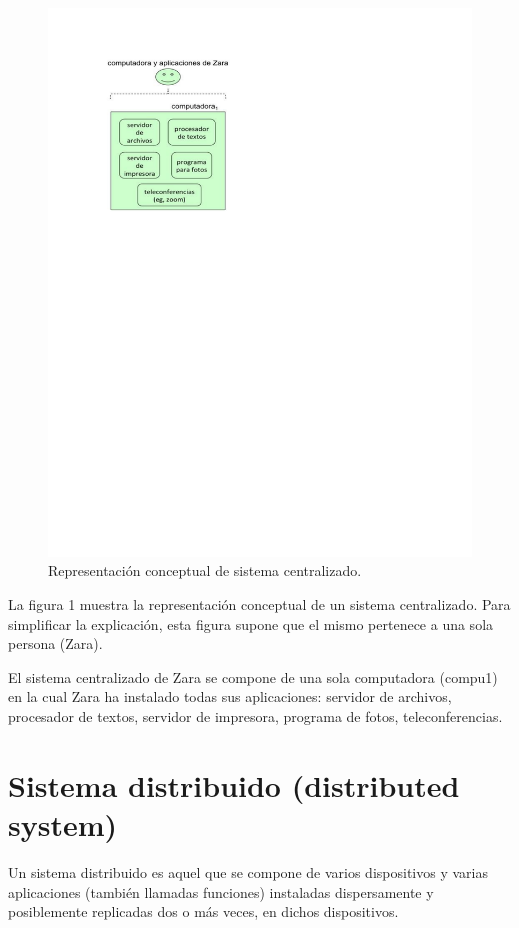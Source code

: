 \documentclass[12pt]{report} %
\begin{document}
\begin{itemize}
\begin{figure}
\centering
\includegraphics[width=0.85\columnwidth]{imagenes/imagendesc1.pdf}
\caption{Representación conceptual de sistema centralizado.}
\label{imagendesc1}
\end{figure} 

La figura 1 muestra la representación conceptual de un sistema centralizado. Para simplificar la explicación, esta figura supone que el mismo pertenece a una sola persona (Zara). 

El sistema centralizado de Zara se compone de una sola computadora (compu1) en la cual Zara ha instalado todas sus aplicaciones: servidor de archivos, procesador de textos, servidor de impresora, programa de fotos, teleconferencias. 

\section{Sistema distribuido (distributed system)}

Un sistema distribuido es aquel que se compone de varios dispositivos y varias aplicaciones (también llamadas funciones) instaladas dispersamente y posiblemente replicadas dos o más veces, en dichos dispositivos. 


\end{itemize}
\end{document}
